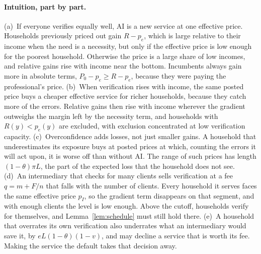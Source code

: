 \documentclass[12pt]{article}
\theoremstyle{remark}
\begin{document}
\paragraph{Intuition, part by part.} (a)~If everyone verifies equally well, AI is a new service at one effective price. Households previously priced out gain $R-p_e$, which is large relative to their income when the need is a necessity, but only if the effective price is low enough for the poorest household. Otherwise the price is a large share of low incomes, and relative gains rise with income near the bottom. Incumbents always gain more in absolute terms, $P_0-p_e\ge R-p_e$, because they were paying the professional's price. (b)~When verification rises with income, the same posted price buys a cheaper effective service for richer households, because they catch more of the errors. Relative gains then rise with income wherever the gradient outweighs the margin left by the necessity term, and households with $R(y)<p_e(y)$ are excluded, with exclusion concentrated at low verification capacity. (c)~Overconfidence adds losses, not just smaller gains. A household that underestimates its exposure buys at posted prices at which, counting the errors it will act upon, it is worse off than without AI. The range of such prices has length $(1-\theta)\pi L$, the part of the expected loss that the household does not see. (d)~An intermediary that checks for many clients sells verification at a fee $q=m+F/n$ that falls with the number of clients. Every household it serves faces the same effective price $p_I$, so the gradient term disappears on that segment, and with enough clients the level is low enough. Above the cutoff, households verify for themselves, and Lemma~\ref{lem:schedule} must still hold there. (e)~A household that overrates its own verification also underrates what an intermediary would save it, by $eL(1-\theta)(1-v)$, and may decline a service that is worth its fee. Making the service the default takes that decision away.
\end{document}
